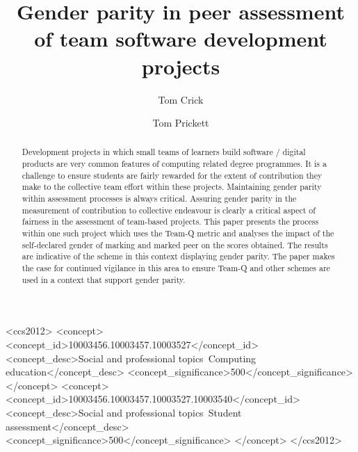 \documentclass[sigconf, anonymous=true]{acmart}
\begin{document}
\title{Gender parity in peer assessment of team software development projects}

\author{Tom Crick}


\author{Tom Prickett}


\renewcommand{\shortauthors}{Crick and Prickett, et al.}

\begin{abstract}
  Development projects in which small teams of learners build software / digital products are very common features of computing related degree programmes. It is a challenge to ensure students are fairly rewarded for the extent of contribution they make to the collective team effort within these projects. Maintaining gender parity within assessment processes is always critical.  Assuring gender parity in the measurement of contribution to collective endeavour is clearly a critical aspect of fairness in the assessment of team-based projects. This paper presents the process within one such project which uses the Team-Q metric \cite{Britton2017} and analyses the impact of the self-declared gender of marking and marked peer on the scores obtained. The results are indicative of the scheme in this context displaying gender parity.  The paper makes the case for continued vigilance in this area to ensure Team-Q and other schemes are used in a context that support gender parity.    
\end{abstract}

\begin{CCSXML}
<ccs2012>
   <concept>
       <concept_id>10003456.10003457.10003527</concept_id>
       <concept_desc>Social and professional topics~Computing education</concept_desc>
       <concept_significance>500</concept_significance>
       </concept>
   <concept>
       <concept_id>10003456.10003457.10003527.10003540</concept_id>
       <concept_desc>Social and professional topics~Student assessment</concept_desc>
       <concept_significance>500</concept_significance>
       </concept>
 </ccs2012>
\end{CCSXML}
\end{document}
